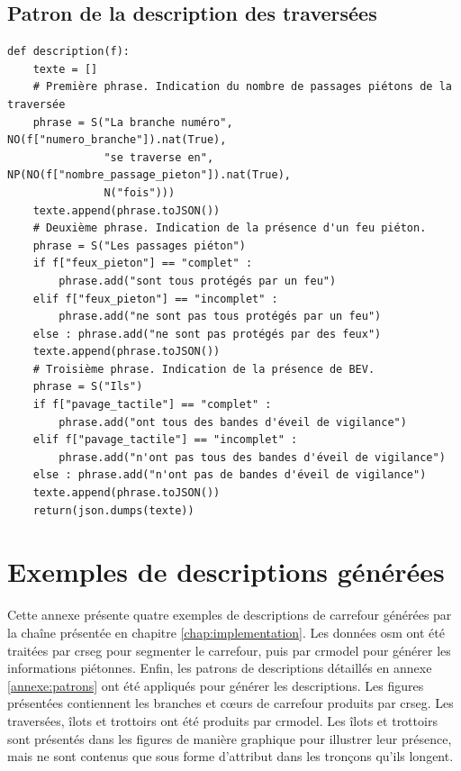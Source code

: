\begin{appendix}
\section*{Patron de la description des traversées}

\begin{verbatim}
def description(f):
    texte = []
    # Première phrase. Indication du nombre de passages piétons de la traversée
    phrase = S("La branche numéro",  NO(f["numero_branche"]).nat(True), 
               "se traverse en", NP(NO(f["nombre_passage_pieton"]).nat(True), 
               N("fois")))
    texte.append(phrase.toJSON())
    # Deuxième phrase. Indication de la présence d'un feu piéton.
    phrase = S("Les passages piéton")
    if f["feux_pieton"] == "complet" : 
        phrase.add("sont tous protégés par un feu")
    elif f["feux_pieton"] == "incomplet" : 
        phrase.add("ne sont pas tous protégés par un feu")
    else : phrase.add("ne sont pas protégés par des feux")
    texte.append(phrase.toJSON())
    # Troisième phrase. Indication de la présence de BEV.
    phrase = S("Ils")
    if f["pavage_tactile"] == "complet" : 
        phrase.add("ont tous des bandes d'éveil de vigilance")
    elif f["pavage_tactile"] == "incomplet" : 
        phrase.add("n'ont pas tous des bandes d'éveil de vigilance")
    else : phrase.add("n'ont pas de bandes d'éveil de vigilance")
    texte.append(phrase.toJSON())
    return(json.dumps(texte))
\end{verbatim}

\chapter{Exemples de descriptions générées}
\label{annexe:exemples}

Cette annexe présente quatre exemples de descriptions de carrefour générées par la chaîne présentée en chapitre \ref{chap:implementation}. Les données \gls{osm} ont été traitées par crseg pour segmenter le carrefour, puis par crmodel pour générer les informations piétonnes. Enfin, les patrons de descriptions détaillés en annexe \ref{annexe:patrons} ont été appliqués pour générer les descriptions. Les figures présentées contiennent les branches et cœurs de carrefour produits par crseg. Les traversées, îlots et trottoirs ont été produits par crmodel. Les îlots et trottoirs sont présentés dans les figures de manière graphique pour illustrer leur présence, mais ne sont contenus que sous forme d'attribut dans les tronçons qu'ils longent.


\end{appendix}
